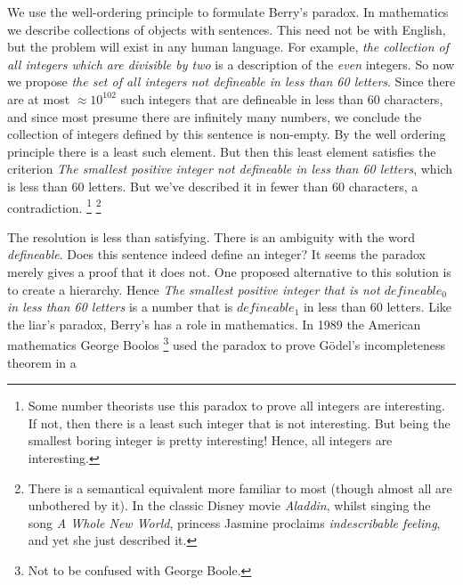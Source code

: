         We use the well-ordering principle to formulate Berry's paradox. In
        mathematics we describe collections of objects with sentences. This need
        not be with English, but the problem will exist in any human language.
        For example,
        \textit{the collection of all integers which are divisible by two} is a
        description of the \textit{even} integers. So now we propose
        \textit{the set of all integers not defineable in less than 60 letters}.
        Since there are at most $\approx{10}^{102}$ such integers that are
        defineable in less than 60 characters, and since most presume there are
        infinitely many numbers, we conclude the collection of integers defined
        by this sentence is non-empty. By the well ordering principle there
        is a least such element. But then this least element satisfies the
        criterion \textit{The smallest positive integer not defineable in less}
        \textit{than 60 letters}, which is less than 60 letters. But we've
        described it in fewer than 60 characters, a contradiction.%
        \footnote{%
            Some number theorists use this paradox to prove all integers are
            interesting. If not, then there is a least such integer that is
            not interesting. But being the smallest boring integer is pretty
            interesting! Hence, all integers are interesting.%
        }
        \footnote{%
            There is a semantical equivalent more familiar to most (though
            almost all are unbothered by it). In the classic Disney movie
            \textit{Aladdin}, whilst singing the song
            \textit{A Whole New World}, princess Jasmine proclaims
            \textit{indescribable feeling}, and yet she just described it.
        }
        \par\hfill\par
        The resolution is less than satisfying. There is an ambiguity with
        the word \textit{defineable}. Does this sentence indeed define an
        integer? It seems the paradox merely gives a proof that it does not. One
        proposed alternative to this solution is to create a hierarchy. Hence
        \textit{The smallest positive integer that is not $defineable_{0}$}
        \textit{in less than 60 letters} is a number that is $defineable_{1}$ in
        less than 60 letters. Like the liar's paradox, Berry's has a role in
        mathematics. In 1989 the American mathematics George
        Boolos%
        \footnote{Not to be confused with George Boole.}
        used the paradox to prove G\"{o}del's incompleteness theorem in a
